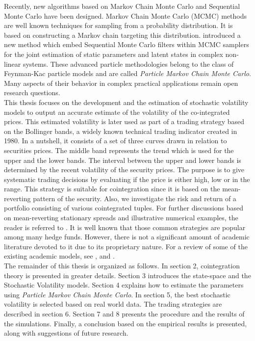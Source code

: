 \documentclass[11pt,a4,twosided,singlespacing,titlepagenumber=on]{scrreprt}
\numberwithin{equation}{chapter} %
\theoremstyle{remark}
\begin{document}
Recently, new algorithms based on Markov Chain Monte Carlo and Sequential Monte Carlo have been designed. Markov Chain Monte Carlo (MCMC) methods are well known techniques for sampling from a probability distribution. It is based on constructing a Markov chain targeting this distribution. \cite{andrieu2010} introduced a new method which embed Sequential Monte Carlo filters within MCMC samplers for the joint estimation of static parameters and latent states in complex non-linear systems. These advanced particle methodologies belong to the class of Feynman-Kac particle models and are called \textit{Particle Markov Chain Monte Carlo}. Many aspects of their behavior in complex practical applications remain open research questions. \\

This thesis focuses on the development and the estimation of stochastic volatility models to output an accurate estimate of the volatility of the co-integrated prices. This estimated volatility is later used as part of a trading strategy based on the Bollinger bands, a widely known technical trading indicator created in 1980. In a nutshell, it consists of a set of three curves drawn in relation to securities prices. The middle band represents the trend which is used for the upper and the lower bands. The interval between the upper and lower bands is determined by the recent volatility of the security prices. The purpose is to give systematic trading decisions by evaluating if the price is either high, low or in the range. This strategy is suitable for cointegration since it is based on the mean-reverting pattern of the security. Also, we investigate the risk and return of a portfolio consisting of various cointegrated tuples. For further discussions based on mean-reverting stationary spreads and illustrative numerical examples, the reader is referred to \cite{vidyamurthy2004}.  It is well known that those common strategies are popular among many hedge funds. However, there is not a significant amount of academic literature devoted to it due to its proprietary nature. For a review of some of the existing academic models, see \cite{gatev2006}, \cite{perlin2009} and \cite{broussard2012}. \\

The remainder of this thesis is organized as follows. In section 2, cointegration theory is presented in greater details. Section 3 introduces the state-space and the Stochastic Volatility models. Section 4 explains how to estimate the parameters using \textit{Particle Markov Chain Monte Carlo}. In section 5, the best stochastic volatility is selected based on real world data. The trading strategies are described in section 6. Section 7 and 8 presents the procedure and the results of the simulations. Finally, a conclusion based on the empirical results is presented, along with suggestions of future research.
\end{document}
